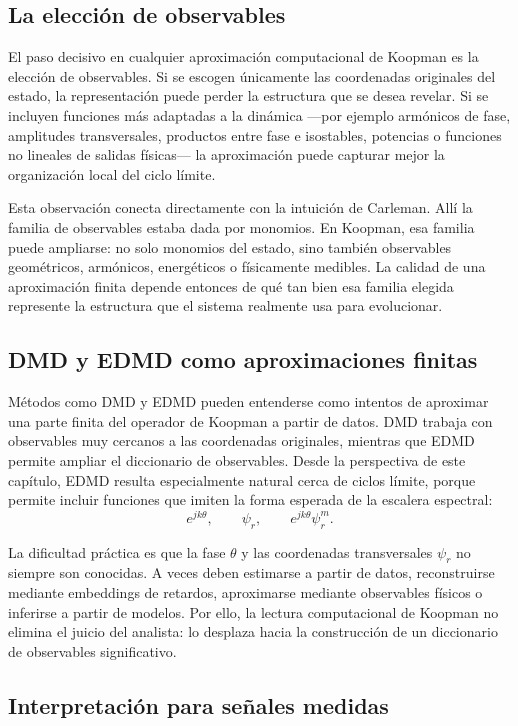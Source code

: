 \subsection{La elección de observables}

El paso decisivo en cualquier aproximación computacional de Koopman es la elección de observables. Si se escogen únicamente las coordenadas originales del estado, la representación puede perder la estructura que se desea revelar. Si se incluyen funciones más adaptadas a la dinámica —por ejemplo armónicos de fase, amplitudes transversales, productos entre fase e isostables, potencias o funciones no lineales de salidas físicas— la aproximación puede capturar mejor la organización local del ciclo límite.

Esta observación conecta directamente con la intuición de Carleman. Allí la familia de observables estaba dada por monomios. En Koopman, esa familia puede ampliarse: no solo monomios del estado, sino también observables geométricos, armónicos, energéticos o físicamente medibles. La calidad de una aproximación finita depende entonces de qué tan bien esa familia elegida represente la estructura que el sistema realmente usa para evolucionar.

\subsection{DMD y EDMD como aproximaciones finitas}

Métodos como DMD y EDMD pueden entenderse como intentos de aproximar una parte finita del operador de Koopman a partir de datos. DMD trabaja con observables muy cercanos a las coordenadas originales, mientras que EDMD permite ampliar el diccionario de observables. Desde la perspectiva de este capítulo, EDMD resulta especialmente natural cerca de ciclos límite, porque permite incluir funciones que imiten la forma esperada de la escalera espectral:
\[
e^{jk\theta},\qquad
\psi_r,\qquad
e^{jk\theta}\psi_r^m.
\]

La dificultad práctica es que la fase \(\theta\) y las coordenadas transversales \(\psi_r\) no siempre son conocidas. A veces deben estimarse a partir de datos, reconstruirse mediante embeddings de retardos, aproximarse mediante observables físicos o inferirse a partir de modelos. Por ello, la lectura computacional de Koopman no elimina el juicio del analista: lo desplaza hacia la construcción de un diccionario de observables significativo.

\subsection{Interpretación para señales medidas}


